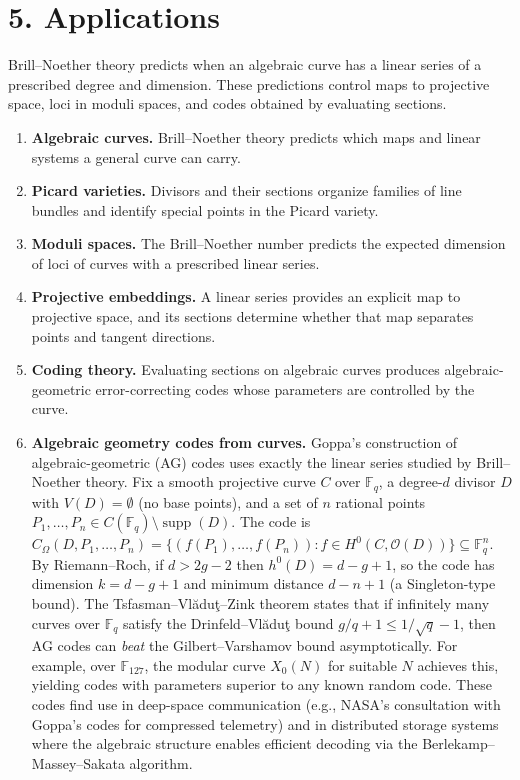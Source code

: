 \section*{5. Applications}
Brill--Noether theory predicts when an algebraic curve has a linear series of a prescribed degree and dimension. These predictions control maps to projective space, loci in moduli spaces, and codes obtained by evaluating sections.
\begin{enumerate}[leftmargin=*,itemsep=0.35em]
\item \textbf{Algebraic curves.} Brill--Noether theory predicts which maps and linear systems a general curve can carry.
\item \textbf{Picard varieties.} Divisors and their sections organize families of line bundles and identify special points in the Picard variety.
\item \textbf{Moduli spaces.} The Brill--Noether number predicts the expected dimension of loci of curves with a prescribed linear series.
\item \textbf{Projective embeddings.} A linear series provides an explicit map to projective space, and its sections determine whether that map separates points and tangent directions.
\item \textbf{Coding theory.} Evaluating sections on algebraic curves produces algebraic-geometric error-correcting codes whose parameters are controlled by the curve.
\item \textbf{Algebraic geometry codes from curves.} Goppa's construction of algebraic-geometric (AG) codes uses exactly the linear series studied by Brill--Noether theory. Fix a smooth projective curve $C$ over $\mathbb F_q$, a degree-$d$ divisor $D$ with $V(D)=\emptyset$ (no base points), and a set of $n$ rational points $P_1,\ldots,P_n\in C(\mathbb F_q)\setminus\operatorname{supp}(D)$. The code is $C_\Omega(D,P_1,\ldots,P_n)=\{(f(P_1),\ldots,f(P_n)):f\in H^0(C,\mathcal O(D))\}\subseteq\mathbb F_q^n$. By Riemann--Roch, if $d>2g-2$ then $h^0(D)=d-g+1$, so the code has dimension $k=d-g+1$ and minimum distance $d-n+1$ (a Singleton-type bound). The Tsfasman--Vlăduţ--Zink theorem states that if infinitely many curves over $\mathbb F_q$ satisfy the Drinfeld--Vlăduţ bound $g/q+1\le 1/\sqrt{q}-1$, then AG codes can \emph{beat} the Gilbert--Varshamov bound asymptotically. For example, over $\mathbb F_{127}$, the modular curve $X_0(N)$ for suitable $N$ achieves this, yielding codes with parameters superior to any known random code. These codes find use in deep-space communication (e.g., NASA's consultation with Goppa's codes for compressed telemetry) and in distributed storage systems where the algebraic structure enables efficient decoding via the Berlekamp--Massey--Sakata algorithm.
\end{enumerate}

